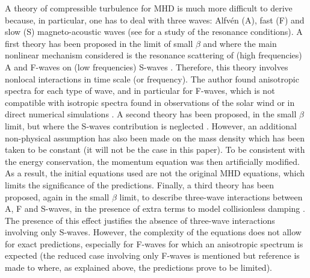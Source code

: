 \documentclass{jpp}
\begin{document}
A theory of compressible turbulence for MHD is much more difficult to derive because, in particular, one has to deal with three waves: Alfv\'en (A), fast (F) and slow (S) magneto-acoustic waves (see \cite{Galtier2001} for a study of the resonance conditions). A first theory has been proposed in the limit of small $\beta$ and where the main nonlinear mechanism considered is the resonance scattering of (high frequencies) A and F-waves on (low frequencies) S-waves \citep{Kuznetsov2001}. Therefore, this theory involves nonlocal interactions in time scale (or frequency). 
The author found anisotropic spectra for each type of wave, and in particular for F-waves, which is not compatible with isotropic spectra found in observations of the solar wind \citep{Zhao2022b} or in direct numerical simulations \citep{Cho2002,Makwana2020}. 
%
A second theory has been proposed, in the small $\beta$ limit, but where the S-waves contribution is neglected \citep{Chandran2005}. However, an additional non-physical assumption has also been made on the mass density which has been taken to be constant (it will not be the case in this paper). To be consistent with the energy conservation, the momentum equation was then artificially modified. As a result, the initial equations used are not the original MHD equations, which limits the significance of the predictions. 
%
Finally, a third theory has been proposed, again in the small $\beta$ limit, to describe three-wave interactions between A, F and S-waves, in the presence of extra terms to model collisionless damping \citep{Chandran2008}. The presence of this effect justifies the absence of three-wave interactions involving only S-waves. However, the complexity of the equations does not allow for exact predictions, especially for F-waves for which an anisotropic spectrum is expected (the reduced case involving only F-waves is mentioned but reference is made to \cite{Chandran2005} where, as explained above, the predictions prove to be limited). 
\end{document}
